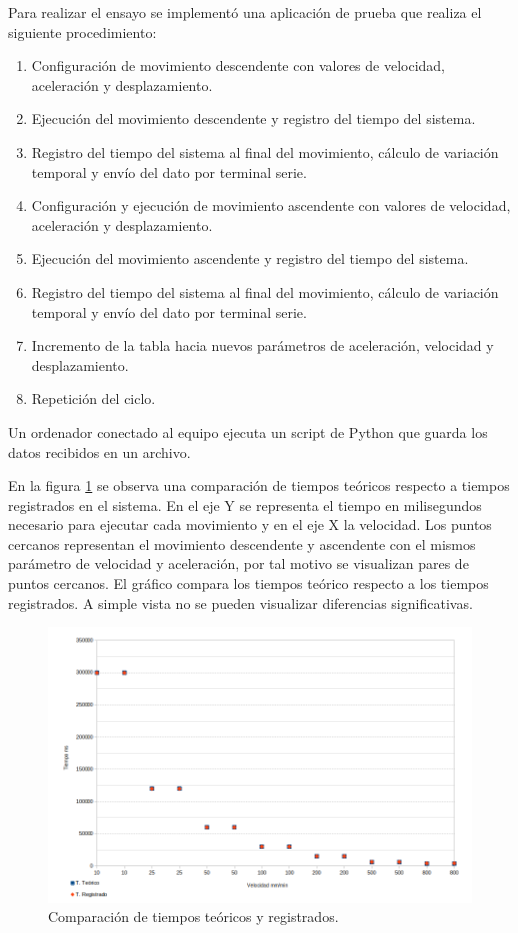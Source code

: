 Para realizar el ensayo se implementó una aplicación de prueba que realiza el siguiente procedimiento:

\begin{enumerate}
\item Configuración de movimiento descendente con valores de velocidad, aceleración y desplazamiento.
\item Ejecución del movimiento descendente y registro del tiempo del sistema.
\item Registro del tiempo del sistema al final del movimiento, cálculo de variación temporal y envío del dato por terminal serie.
\item Configuración y ejecución de movimiento ascendente con valores de velocidad, aceleración y desplazamiento.
\item Ejecución del movimiento ascendente y registro del tiempo del sistema.
\item Registro del tiempo del sistema al final del movimiento, cálculo de variación temporal y envío del dato por terminal serie.
\item Incremento de la tabla hacia nuevos parámetros de aceleración, velocidad y desplazamiento.
\item Repetición del ciclo.
\end{enumerate}

Un ordenador conectado al equipo ejecuta un script de Python que guarda los datos recibidos en un archivo.

En la figura \ref{fig:tiempo_movimiento_1} se observa una comparación de tiempos teóricos respecto a  tiempos registrados en el sistema. En el eje Y se representa el tiempo en milisegundos necesario para ejecutar cada movimiento y en el eje X la velocidad. Los puntos cercanos representan el movimiento descendente y ascendente con el mismos parámetro de velocidad y aceleración, por tal motivo se visualizan pares de puntos cercanos. El gráfico compara los tiempos teórico respecto a los tiempos registrados. A simple vista no se pueden visualizar diferencias significativas.

\begin{figure}[h]
\centering 
\includegraphics[width=1\textwidth]{./Figures/tiempo_movimiento_1.png}
\caption{Comparación de tiempos teóricos y registrados.}
\label{fig:tiempo_movimiento_1}
\end{figure}

